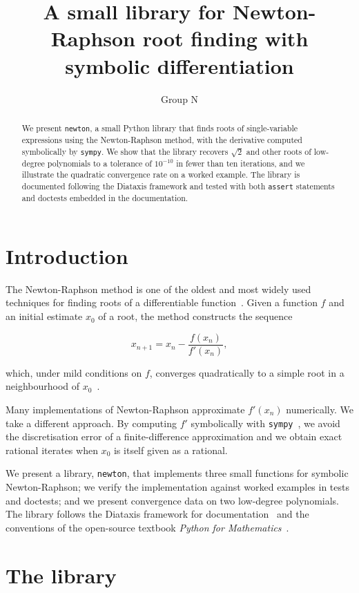 \documentclass[11pt]{article}
\title{A small library for Newton-Raphson root finding with
       symbolic differentiation}
\author{Group N}
\date{}
\begin{document}
\maketitle

\begin{abstract}
We present \texttt{newton}, a small Python library that finds roots of
single-variable expressions using the Newton-Raphson method, with the
derivative computed symbolically by \texttt{sympy}. We show that the
library recovers \(\sqrt{2}\) and other roots of low-degree polynomials
to a tolerance of \(10^{-10}\) in fewer than ten iterations, and we
illustrate the quadratic convergence rate on a worked example. The
library is documented following the Diataxis framework and tested with
both \texttt{assert} statements and doctests embedded in the
documentation.
\end{abstract}

\section{Introduction}

The Newton-Raphson method is one of the oldest and most widely used
techniques for finding roots of a differentiable function~\cite{burden2015}.
Given a function \(f\) and an initial estimate \(x_0\) of a root, the method
constructs the sequence

\[
    x_{n + 1} = x_n - \frac{f(x_n)}{f'(x_n)},
\]

which, under mild conditions on \(f\), converges quadratically to a simple
root in a neighbourhood of \(x_0\)~\cite{atkinson1988}.

Many implementations of Newton-Raphson approximate \(f'(x_n)\) numerically.
We take a different approach. By computing \(f'\) symbolically with
\texttt{sympy}~\cite{meurer2017}, we avoid the discretisation error of a
finite-difference approximation and we obtain exact rational iterates when
\(x_0\) is itself given as a rational.

We present a library, \texttt{newton}, that
implements three small functions for symbolic Newton-Raphson; we verify
the implementation against worked examples in tests and doctests; and we
present convergence data on two low-degree polynomials. The library
follows the Diataxis framework for documentation~\cite{procida2017} and
the conventions of the open-source textbook
\emph{Python for Mathematics}~\cite{knight2024}.

\section{The library}
\end{document}
